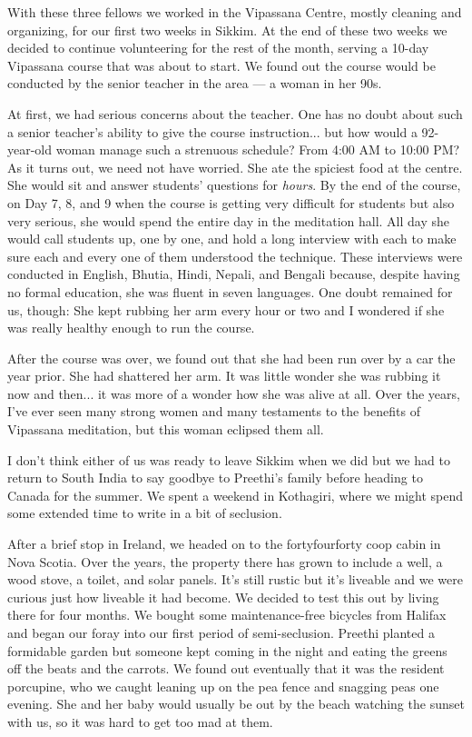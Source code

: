 \documentclass{article}
\begin{document}
With these three fellows we worked in the Vipassana Centre, mostly cleaning and
organizing, for our first two weeks in Sikkim. At the end of these two weeks we
decided to continue volunteering for the rest of the month, serving a 10-day
Vipassana course that was about to start. We found out the course would be conducted
by the senior teacher in the area --- a woman in her 90s.

At first, we had serious concerns about the teacher. One has no doubt about such a
senior teacher's ability to give the course instruction... but how would a
92-year-old woman manage such a strenuous schedule? From 4:00 AM to 10:00 PM? As it
turns out, we need not have worried. She ate the spiciest food at the centre. She
would sit and answer students' questions for \textit{hours}. By the end of the
course, on Day 7, 8, and 9 when the course is getting very difficult for students but
also very serious, she would spend the entire day in the meditation hall. All day she
would call students up, one by one, and hold a long interview with each to make sure
each and every one of them understood the technique. These interviews were conducted
in English, Bhutia, Hindi, Nepali, and Bengali because, despite having no formal education,
she was fluent in seven languages. One doubt remained for us, though: She kept
rubbing her arm every hour or two and I wondered if she was really healthy enough to
run the course.

After the course was over, we found out that she had been run over by a car the year
prior. She had shattered her arm. It was little wonder she was rubbing it now and
then... it was more of a wonder how she was alive at all. Over the years, I've ever
seen many strong women and many testaments to the benefits of Vipassana meditation,
but this woman eclipsed them all.

I don't think either of us was ready to leave Sikkim when we did but we had to return
to South India to say goodbye to Preethi's family before heading to Canada for the
summer. We spent a weekend in Kothagiri, where we might spend some extended time to
write in a bit of seclusion.

After a brief stop in Ireland, we headed on to the fortyfourforty coop cabin in Nova
Scotia. Over the years, the property there has grown to include a well, a wood stove,
a toilet, and solar panels. It's still rustic but it's liveable and we were curious
just how liveable it had become. We decided to test this out by living there for four
months. We bought some maintenance-free bicycles from Halifax and began our foray
into our first period of semi-seclusion. Preethi planted a formidable garden but
someone kept coming in the night and eating the greens off the beats and the
carrots. We found out eventually that it was the resident porcupine, who we caught
leaning up on the pea fence and snagging peas one evening. She and her baby would
usually be out by the beach watching the sunset with us, so it was hard to get too
mad at them.
\end{document}
